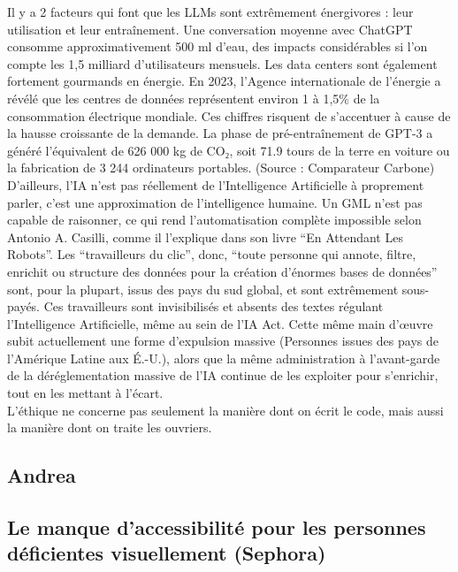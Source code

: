 \documentclass{article}
\begin{document}
Il y a 2 facteurs qui font que les LLMs sont extrêmement énergivores : leur utilisation et leur entraînement. Une conversation moyenne avec ChatGPT consomme approximativement 500 ml d’eau, des impacts considérables si l’on compte les 1,5 milliard d’utilisateurs mensuels. Les data centers sont également fortement gourmands en énergie. En 2023, l’Agence internationale de l’énergie a révélé que les centres de données représentent environ 1 à 1,5\% de la consommation électrique mondiale. Ces chiffres risquent de s'accentuer à cause de la hausse croissante de la demande. La phase de pré-entraînement de GPT-3 a généré l’équivalent de 626 000 kg de CO₂, soit 71.9 tours de la terre en voiture ou la fabrication de 3 244 ordinateurs portables. (Source : Comparateur Carbone)\\

D’ailleurs, l’IA n’est pas réellement de l’Intelligence Artificielle à proprement parler, c’est une approximation de l’intelligence humaine. Un GML n’est pas capable de raisonner, ce qui rend l’automatisation complète impossible selon Antonio A. Casilli, comme il l’explique dans son livre “En Attendant Les Robots”. Les “travailleurs du clic”, donc, “toute personne qui annote, filtre, enrichit ou structure des données pour la création d’énormes bases de données” sont, pour la plupart, issus des pays du sud global, et sont extrêmement sous-payés. Ces travailleurs sont invisibilisés et absents des textes régulant l’Intelligence Artificielle, même au sein de l’IA Act. Cette même main d’œuvre subit actuellement une forme d’expulsion massive (Personnes issues des pays de l’Amérique Latine aux É.-U.), alors que la même administration à l’avant-garde de la déréglementation massive de l’IA continue de les exploiter pour s’enrichir, tout en les mettant à l’écart.\\ 


L’éthique ne concerne pas seulement la manière dont on écrit le code, mais aussi la manière dont on traite les ouvriers.\\ 


\subsection{Andrea}


\subsection{Le manque d'accessibilité pour les personnes déficientes visuellement (Sephora)}
\end{document}
